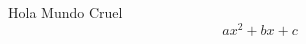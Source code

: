 \documentclass[11pt,twoside]{book}
\begin{document}
Hola Mundo Cruel \\
$$ ax^2 + bx + c $$ \\
\end{document}
